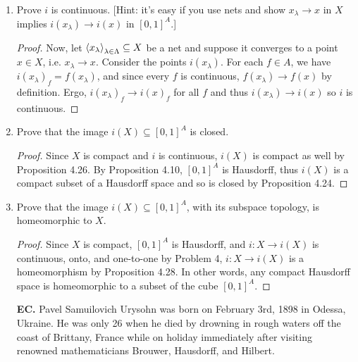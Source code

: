 \documentclass[11pt,oneside,english]{amsart}
\theoremstyle{definition}
\def\<#1>{\mathinner{\langle#1\rangle}}
\begin{document}
\begin{enumerate}
\begin{proof}
We claim now that $x_1=x_2$. Suppose otherwise, i.e. that $x_1\neq x_2$. Since $X$ is a compact Hausdorff space, it is normal by Problem 3, and so $\{x_1\}$ and $\{x_2\}$ are closed sets. Consequently, by Urysohn's lemma, there exists an $f\in A$ such that 
\[
f(\{x_1\})=f(x_1)=0\neq1=f(x_2)=f(\{x_2\}),
\]
a contradiction. Thus, $x_1=x_2$, and so $i$ is one-to-one by definition.
\end{proof}

\item Prove $i$ is continuous. [Hint: it's easy if you use nets and show $x_\lambda \rightarrow x$ in $X$ implies $i(x_\lambda)\rightarrow i(x)$ in $[0,1]^A$.]

\begin{proof}
Now, let $\<x_\lambda>_{\lambda\in \Lambda}\subseteq X$ be a net and suppose it converges to a point $x\in X$, i.e. $x_\lambda\rightarrow x$. Consider the points $i(x_\lambda)$. For each $f\in A$, we have $i(x_\lambda)_f=f(x_\lambda)$, and since every $f$ is continuous, $f(x_\lambda)\rightarrow f(x)$ by definition. Ergo, $i(x_\lambda)_f\rightarrow i(x)_f$ for all $f$ and thus $i(x_\lambda)\rightarrow i(x)$ so $i$ is continuous. 
\end{proof}

\pagebreak

\item Prove that the image $i(X)\subseteq [0,1]^A$ is closed.

\begin{proof}
Since $X$ is compact and $i$ is continuous, $i(X)$ is compact as well by Proposition 4.26. By Proposition 4.10, $[0,1]^A$ is Hausdorff, thus $i(X)$ is a compact subset of a Hausdorff space and so is closed by Proposition 4.24.
\end{proof}


\item Prove that the image $i(X)\subseteq [0,1]^A$, with its subspace topology, is homeomorphic to $X$.

\begin{proof}
Since $X$ is compact, $[0,1]^A$ is Hausdorff, and $i:X\rightarrow i(X)$ is continuous, onto, and one-to-one by Problem 4, $i:X\rightarrow i(X)$ is a homeomorphism by Proposition 4.28. In other words, any compact Hausdorff space is homeomorphic to a subset of the cube $[0,1]^A$.
\end{proof}

\item[\textbf{EC.}] Pavel Samuilovich Urysohn was born on February 3rd, 1898 in Odessa, Ukraine. He was only 26 when he died by drowning in rough waters off the coast of Brittany, France while on holiday immediately after visiting renowned mathematicians Brouwer, Hausdorff, and Hilbert.

\end{enumerate}
\end{document}
